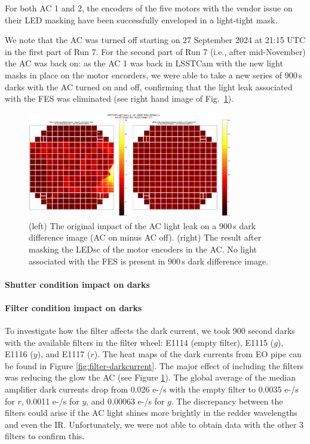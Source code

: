 For both AC 1 and 2, the encoders of the five motors with the vendor issue on
their LED masking have been successfully enveloped in a light-tight
mask.

We note that the AC was turned off starting on 27 September 2024 at 21:15 UTC in the
first part of Run 7. For the second part of Run 7 (i.e., after
mid-November) the AC was back on: as the AC 1 was back in LSSTCam with
the new light masks in place on the motor encorders, we were able to take a new series of
900\,s darks with the AC turned on and off, confirming that the light leak
associated with the FES was eliminated (see right hand image of Fig.~\ref{fig:ac-light-leak}).

\begin{figure}[ht]
\begin{centering}
\includegraphics[width=0.8\textwidth]{figures/AC_LightLeak_study.png}
\caption{ (left) The original impact of the AC light leak on a 900\,s dark difference image (AC on minus AC off). (right) The result after masking the LEDsc of the motor encoders in the AC.  No light associated with the FES is present in 900\,s dark difference image.  \label{fig:ac-light-leak}}
\end{centering}
\end{figure}

\paragraph{Shutter condition impact on
darks}\label{shutter-condition-impact-on-darks}

\paragraph{Filter condition impact on
darks}\label{filter-condition-impact-on-darks}

To investigate how the filter affects the dark current, we took 900 second darks with the available filters in the filter wheel: E1114 (empty filter), E1115 ($g$), E1116 ($y$), and E1117 ($r$). The heat maps of the dark currents from EO pipe can be found in Figure \ref{fig:filter-darkcurrent}. The major effect of including the filters was reducing the glow the AC (see Figure \ref{fig:ac-light-leak}). The global average of the median amplifier dark currents drop from 0.026 e-/s with the empty filter to 0.0035 e-/s for $r$, 0.0011 e-/s for $y$, and 0.00063 e-/s for $g$. The discrepancy between the filters could arise if the AC light shines more brightly in the redder wavelengths and even the IR. Unfortunately, we were not able to obtain data with the other 3 filters to confirm this.

